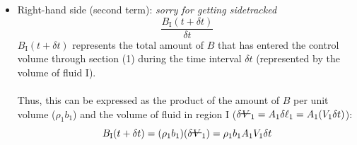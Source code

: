 ﻿\documentclass[12pt]{article}
\newcommand{\vol}{\mathord{\text{\ooalign{\hidewidth $V$\hidewidth\cr\kern-0.5pt\raisebox{0.8ex}{\rule[0pt]{1em}{0.5pt}}}}}}
\begin{document}
\begin{itemize}
\begin{examplebox}
\begin{itemize}
    \item Example for when fluid occupies an increasing portion of the control volume:
    \begin{itemize}
        \item \textbf{Mass ($B=M$, $b=1$):} Water fills an initially empty tank, increasing the volume occupied by water and therefore its total mass, even though the water's density remains constant.

Consider a fixed control volume consisting of a tank, with constant cross-sectional area $A$, total height $H$, and water level $h(t)$. The water density field is defined as:
\[
\rho(z,t)=
\begin{cases}
\rho_{\text{water}}, & 0\leq z\leq h(t)\\
0, & h(t)<z\leq H
\end{cases}
\]
Integrating over the fixed control volume:
\begin{align*}
M_{\mathrm{water}}(t)
&= \int_{\mathrm{C\vol}}\rho(z,t)\,(1)\,d\vol\\
&= A\int_0^H\rho(z,t)\,dz\\
&= A\left[\int_0^{h(t)}\rho_{\mathrm{water}}\,dz+\int_{h(t)}^H0\,dz\right]\\
&= \rho_{\mathrm{water}}Ah(t) = \rho_{\mathrm{water}}\vol_{\mathrm{water}}(t)
\end{align*}
Therefore, the rate of accumulation inside the control volume is:
\[
\frac{dM_{\mathrm{water}}}{dt}
=\rho_{\mathrm{water}} A\frac{dh}{dt}
=\rho_{\mathrm{water}}\frac{d\vol_{\mathrm{water}}}{dt}>0
\]
Although the control volume and its integration limits remain fixed, the density field $\rho(z,t)$ changes with time as water occupies an increasing portion of the tank.
    \end{itemize}
\end{itemize}
\end{examplebox}
\item  Right-hand side (second term): \textit{sorry for getting sidetracked}
\[\frac{B_{\mathrm{I}}(t+\delta t)}{\delta t}\]
$B_{\mathrm{I}}(t+\delta t)$ represents the total amount of $B$ that has entered the control volume through section (1) during the time interval $\delta t$ (represented by the volume of fluid I).\\\\
Thus, this can be expressed as the product of the amount of $B$ per unit volume ($\rho_1 b_1$) and the volume of fluid in region I ($\delta \vol_1 = A_1 \delta \ell_1 = A_1 (V_1 \delta t)$):
\[B_{\mathrm{I}}(t+\delta t) = (\rho_1 b_1) (\delta \vol_1) = \rho_1 b_1 A_1 V_1 \delta t\]

\end{itemize}
\end{document}
